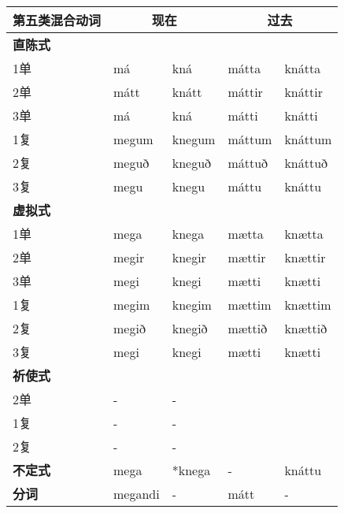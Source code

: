 \begin{longtable}{lll|ll}
    \toprule
    第五类混合动词  & \multicolumn{2}{c}{现在} & \multicolumn{2}{c}{过去}                    \\
    \midrule
    \endhead
    \bottomrule
    \endfoot
    \textbf{直陈式} & ~                        & \multicolumn{1}{c}{}     & ~      & ~       \\
    1单             & má                       & kná                      & mátta  & knátta  \\
    2单             & mátt                     & knátt                    & máttir & knáttir \\
    3单             & má                       & kná                      & mátti  & knátti  \\
    1复             & megum                    & knegum                   & máttum & knáttum \\
    2复             & meguð                    & kneguð                   & máttuð & knáttuð \\
    3复             & megu                     & knegu                    & máttu  & knáttu  \\
    \textbf{虚拟式} & ~                        & \multicolumn{1}{c}{}     & ~      & ~       \\
    1单             & mega                     & knega                    & mætta  & knætta  \\
    2单             & megir                    & knegir                   & mættir & knættir \\
    3单             & megi                     & knegi                    & mætti  & knætti  \\
    1复             & megim                    & knegim                   & mættim & knættim \\
    2复             & megið                    & knegið                   & mættið & knættið \\
    3复             & megi                     & knegi                    & mætti  & knætti  \\
    \textbf{祈使式} & ~                        & \multicolumn{1}{c}{}     & ~      & ~       \\
    2单             & -                        & -                        & ~      & ~       \\
    1复             & -                        & -                        & ~      & ~       \\
    2复             & -                        & -                        & ~      & ~       \\
    \textbf{不定式} & mega                     & *knega                   & -      & knáttu  \\
    \textbf{分词}   & megandi                  & -                        & mátt   & -       \\
\end{longtable}

